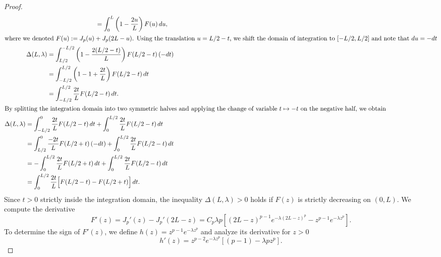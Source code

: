 \documentclass[12pt, a4paper]{article}
\theoremstyle{break}
\theoremstyle{break}
\theoremstyle{break}
\theoremstyle{break}
\theoremstyle{break}
\theoremstyle{break}
\theoremstyle{break}
\theoremstyle{break}
\theoremstyle{break}
\begin{document}
\begin{proof}
\begin{align}
\begin{split}
            &= \int_0^L \left( 1 - \frac{2u}{L} \right) F(u) \, du,
        \end{split} \\
    \intertext{where we denoted $F(u) := J_p(u) + J_p(2L-u)$. Using the translation $u = L/2 - t$, we shift the domain of integration to $[-L/2, L/2]$ and note that $du = -dt$}
        \begin{split}
            \label{eq:Delta_3rd_set}
            \Delta(L, \lambda) &= \int_{L/2}^{-L/2} \left( 1 - \frac{2(L/2 - t)}{L} \right) F(L/2 - t) \, (-dt) \\
            &= \int_{-L/2}^{L/2} \left( 1 - 1 + \frac{2t}{L} \right) F(L/2 - t) \, dt \\
            &= \int_{-L/2}^{L/2} \frac{2t}{L} F(L/2 - t) \, dt. 
        \end{split} \\
    \intertext{By splitting the integration domain into two symmetric halves and applying the change of variable $t \mapsto -t$ on the negative half, we obtain}
        \begin{split}
            \label{eq:Delta_4th_set}
            \Delta(L, \lambda) &= \int_{-L/2}^0 \frac{2t}{L} F(L/2 - t) \, dt + \int_0^{L/2} \frac{2t}{L} F(L/2 - t) \, dt \nonumber \\
            &= \int_{L/2}^0 \frac{-2t}{L} F(L/2 + t) \, (-dt) + \int_0^{L/2} \frac{2t}{L} F(L/2 - t) \, dt \nonumber \\
            &= -\int_0^{L/2} \frac{2t}{L} F(L/2 + t) \, dt + \int_0^{L/2} \frac{2t}{L} F(L/2 - t) \, dt \nonumber \\
            &= \int_0^{L/2} \frac{2t}{L} \Big[ F(L/2 - t) - F(L/2 + t) \Big] \, dt.
        \end{split}
    \end{align}
    Since $t > 0$ strictly inside the integration domain, the inequality $\Delta(L, \lambda) > 0$ holds if $F(z)$ is strictly decreasing on $(0, L)$. We compute the derivative
    \begin{equation*}
        F'(z) = J_p'(z) - J_p'(2L-z) = C_p \lambda p \left[ (2L-z)^{p-1} e^{-\lambda(2L-z)^p} - z^{p-1} e^{-\lambda z^p} \right].
    \end{equation*}
    To determine the sign of $F'(z)$, we define $h(z) = z^{p-1} e^{-\lambda z^p}$ and analyze its derivative for $z > 0$
    \begin{equation*}
        h'(z) = z^{p-2} e^{-\lambda z^p} \left[ (p-1) - \lambda p z^p \right].
    \end{equation*}


\end{proof}
\end{document}
